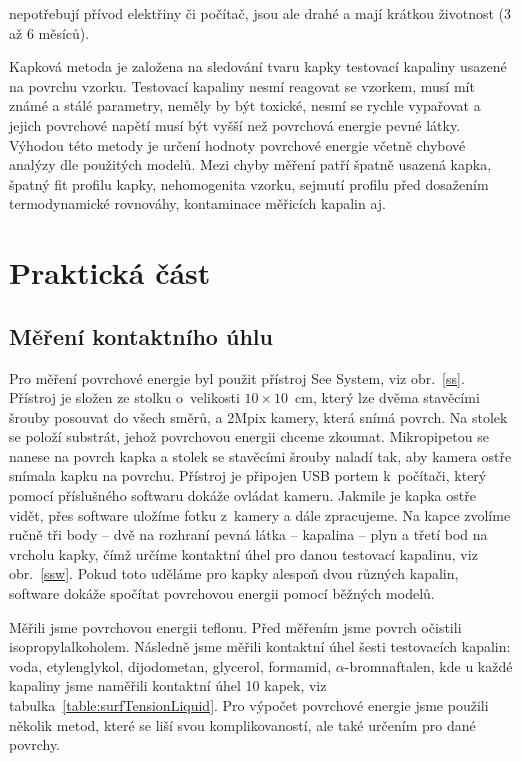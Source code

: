 \documentclass{protokol}
\begin{document}
nepotřebují přívod elektřiny či počítač, jsou ale drahé a mají krátkou 
životnost (3 až 6 měsíců).
\par Kapková metoda je založena na sledování tvaru kapky testovací kapaliny 
usazené na povrchu vzorku. Testovací kapaliny nesmí reagovat se vzorkem, musí 
mít známé a stálé parametry, neměly by být toxické, nesmí se rychle vypařovat a 
jejich povrchové napětí musí být vyšší než povrchová energie pevné látky. 
Výhodou této metody je určení hodnoty povrchové energie včetně chybové analýzy 
dle použitých modelů. Mezi chyby měření patří špatně usazená kapka, špatný fit 
profilu kapky, nehomogenita vzorku, sejmutí profilu před dosažením 
termodynamické rovnováhy, kontaminace měřicích kapalin aj.

\section{Praktická část}
\subsection{Měření kontaktního úhlu}
\par Pro měření povrchové energie byl použit přístroj See System, viz 
obr.~\ref{ss}. Přístroj je složen ze stolku o~velikosti $10 \times 10$~cm, 
který lze dvěma stavěcími šrouby posouvat do všech směrů, a 2Mpix kamery, která 
snímá povrch. Na stolek se položí substrát, jehož povrchovou energii chceme 
zkoumat. Mikropipetou se nanese na povrch kapka a stolek se stavěcími šrouby 
naladí tak, aby kamera ostře snímala kapku na povrchu. Přístroj je připojen USB 
portem k~počítači, který pomocí příslušného softwaru dokáže ovládat kameru. 
Jakmile je kapka ostře vidět, přes software uložíme fotku z~kamery a dále 
zpracujeme. Na kapce zvolíme ručně tři body -- dvě na rozhraní pevná látka -- 
kapalina -- plyn a třetí bod na vrcholu kapky, čímž určíme kontaktní úhel pro 
danou testovací kapalinu, viz obr.~\ref{ssw}. Pokud toto uděláme pro kapky 
alespoň dvou různých kapalin, software dokáže spočítat povrchovou energii 
pomocí běžných modelů. 
\par Měřili jsme povrchovou energii teflonu. Před měřením jsme povrch očistili 
isopropylalkoholem. Následně jsme měřili kontaktní úhel šesti testovacích 
kapalin: voda, etylenglykol, dijodometan, glycerol, formamid, 
$\alpha$-bromnaftalen, kde u každé kapaliny jsme naměřili kontaktní úhel 10 
kapek, viz tabulka~\ref{table:surfTensionLiquid}. Pro výpočet povrchové 
energie jsme použili několik metod, které se liší svou komplikovaností, ale 
také určením pro dané povrchy.
\end{document}
